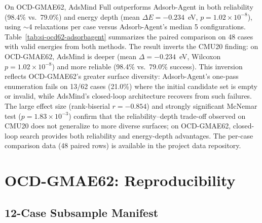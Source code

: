 \documentclass[%
 preprint,
 superscriptaddress,
 amsmath,amssymb,
 aps,
 prb,
 floatfix,
]{revtex4-2}
\begin{document}
On OCD-GMAE62, AdsMind Full outperforms Adsorb-Agent in both reliability (98.4\% vs.\ 79.0\%) and energy depth (mean $\Delta E = -0.234$~eV, $p = 1.02 \times 10^{-8}$), using $\sim$4 relaxations per case versus Adsorb-Agent's median 5 configurations.
Table~\ref{tab:si-ocd62-adsorbagent} summarizes the paired comparison on 48 cases with valid energies from both methods. The result inverts the CMU20 finding: on OCD-GMAE62, AdsMind is deeper (mean $\Delta = -0.234$~eV, Wilcoxon $p = 1.02 \times 10^{-8}$) and more reliable (98.4\% vs.\ 79.0\% success). This inversion reflects OCD-GMAE62's greater surface diversity: Adsorb-Agent's one-pass enumeration fails on 13/62 cases (21.0\%) where the initial candidate set is empty or invalid, while AdsMind's closed-loop architecture recovers from such failures. The large effect size (rank-biserial $r = -0.854$) and strongly significant McNemar test ($p = 1.83 \times 10^{-3}$) confirm that the reliability--depth trade-off observed on CMU20 does not generalize to more diverse surfaces; on OCD-GMAE62, closed-loop search provides both reliability and energy-depth advantages.
The per-case comparison data (48 paired rows) is available in the project data repository.



\section{OCD-GMAE62: Reproducibility}

\subsection{12-Case Subsample Manifest}
\end{document}
